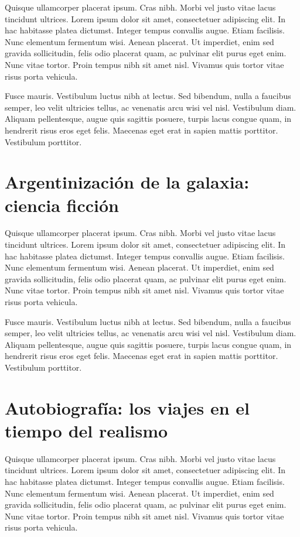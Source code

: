 Quisque ullamcorper placerat ipsum. Cras nibh. Morbi vel justo vitae lacus tincidunt ultrices. Lorem ipsum dolor sit amet, consectetuer adipiscing elit. In hac habitasse platea dictumst. Integer tempus convallis augue. Etiam facilisis. Nunc elementum fermentum wisi. Aenean placerat. Ut imperdiet, enim sed gravida sollicitudin, felis odio placerat quam, ac pulvinar elit purus eget enim. Nunc vitae tortor. Proin tempus nibh sit amet nisl. Vivamus quis tortor vitae risus porta vehicula.

Fusce mauris. Vestibulum luctus nibh at lectus. Sed bibendum, nulla a faucibus semper, leo velit ultricies tellus, ac venenatis arcu wisi vel nisl. Vestibulum diam. Aliquam pellentesque, augue quis sagittis posuere, turpis lacus congue quam, in hendrerit risus eros eget felis. Maecenas eget erat in sapien mattis porttitor. Vestibulum porttitor.

\section{Argentinización de la galaxia: ciencia ficción}

Quisque ullamcorper placerat ipsum. Cras nibh. Morbi vel justo vitae lacus tincidunt ultrices. Lorem ipsum dolor sit amet, consectetuer adipiscing elit. In hac habitasse platea dictumst. Integer tempus convallis augue. Etiam facilisis. Nunc elementum fermentum wisi. Aenean placerat. Ut imperdiet, enim sed gravida sollicitudin, felis odio placerat quam, ac pulvinar elit purus eget enim. Nunc vitae tortor. Proin tempus nibh sit amet nisl. Vivamus quis tortor vitae risus porta vehicula.

Fusce mauris. Vestibulum luctus nibh at lectus. Sed bibendum, nulla a faucibus semper, leo velit ultricies tellus, ac venenatis arcu wisi vel nisl. Vestibulum diam. Aliquam pellentesque, augue quis sagittis posuere, turpis lacus congue quam, in hendrerit risus eros eget felis. Maecenas eget erat in sapien mattis porttitor. Vestibulum porttitor.

\section{Autobiografía: los viajes en el tiempo del realismo}

Quisque ullamcorper placerat ipsum. Cras nibh. Morbi vel justo vitae lacus tincidunt ultrices. Lorem ipsum dolor sit amet, consectetuer adipiscing elit. In hac habitasse platea dictumst. Integer tempus convallis augue. Etiam facilisis. Nunc elementum fermentum wisi. Aenean placerat. Ut imperdiet, enim sed gravida sollicitudin, felis odio placerat quam, ac pulvinar elit purus eget enim. Nunc vitae tortor. Proin tempus nibh sit amet nisl. Vivamus quis tortor vitae risus porta vehicula.

